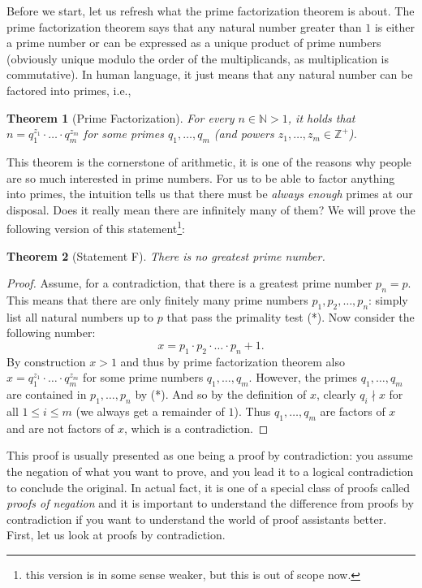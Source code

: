 \documentclass{article}
\newtheorem{theorem}{Theorem}[]
\begin{document}
Before we start, let us refresh what the prime factorization theorem is about.
The prime factorization theorem says that any natural number greater than $1$ is either a prime number or can be expressed as a unique product of prime numbers (obviously unique modulo the order of the multiplicands, as multiplication is commutative).
In human language, it just means that any natural number can be factored  into primes, i.e.,
\begin{theorem}[Prime Factorization]
For every $n \in \mathbb{N} > 1$, it holds that $n = q_1^{z_1} \cdot \ldots \cdot q_m^{z_m}$ for some primes $q_1, \ldots, q_m$ (and powers $z_1, \ldots, z_m \in \mathbb{Z}^+$).
\end{theorem}
This theorem is the cornerstone of arithmetic, it is one of the reasons why people are so much interested in prime numbers.
For us to be able to factor anything into primes, the intuition tells us that there must be \emph{always enough} primes at our disposal. 
Does it really mean there are infinitely many of them?
We will prove the following version of this statement\footnote{this version is in some sense weaker, but this is out of scope now.}:
\begin{theorem}[Statement F]
There is no greatest prime number.
\end{theorem}
\begin{proof}
Assume, for a contradiction, that there is a greatest prime number $p_n = p$.
This means that there are only finitely many prime numbers $p_1, p_2, \ldots, p_n$: simply list all natural numbers up to $p$ that pass the primality test (*).
Now consider the following number:
\[x = p_1 \cdot p_2 \cdot \ldots \cdot p_n + 1.\]
By construction $x > 1$ and thus by prime factorization theorem also $x = q_1^{z_1} \cdot \ldots \cdot q_m^{z_m}$ for some prime numbers $q_1, \ldots, q_m$.
However, the primes $q_1, \ldots, q_m$ are contained in $p_1, \ldots, p_n$ by (*).
And so by the definition of $x$, clearly $q_i \nmid x$ for all $1 \leq i \leq m$ (we always get a remainder of $1$).
Thus $q_1, \ldots, q_m$ are factors of $x$ and are not factors of $x$, which is a contradiction.
\end{proof}

This proof is usually presented as one being a proof by contradiction: you assume the negation of what you want to prove, and you lead it to a logical contradiction to conclude the original.
In actual fact, it is one of a special class of proofs called \emph{proofs of negation} and it is important to understand the difference from proofs by contradiction if you want to understand the world of proof assistants better.
First, let us look at proofs by contradiction.
\end{document}
